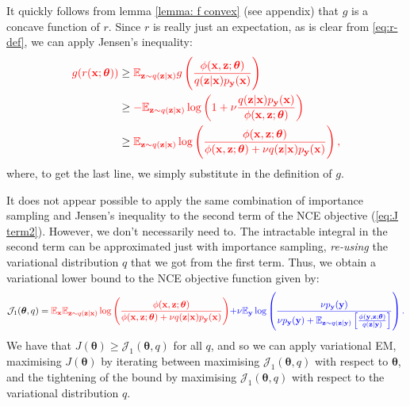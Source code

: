 \documentclass[11pt, oneside]{article}
\newcommand{\thetab}{{\boldsymbol{\theta}}}
\newcommand{\pnn}{\phi}
\newcommand{\pnoise}{p_{ \mathbf y}}
\newcommand{\q}[1]{q(\z|{#1})}
\newcommand{\x}{{\mathbf x}}
\newcommand{\y}{{\mathbf y}}
\newcommand{\z}{{\mathbf z}}
\newcommand{\E}{\mathbb{E}}
\newcommand{\Ex}{\E_{\x}}
\newcommand{\Ey}{\E_{\y}}
\newcommand{\Evar}[1]{\E_{\z \sim \q{#1}}}
\newcommand{\J}{\mathcal{J}}
\theoremstyle{definition}
\begin{document}
It quickly follows from lemma \ref{lemma: f convex} (see appendix) that $g$ is a concave function of $r$. Since $r$ is really just an expectation, as is clear from \ref{eq:r-def}, we can apply Jensen's inequality:
\begin{align}
 \color{red}{g(r(\x; \thetab))}  
    &\geq  \color{red}{\Evar{\x} g \left( \frac{\pnn(\x, \z;\thetab)}{\q{\x}\pnoise(\x)} \right)} \\
    &\geq  \color{red}{-\Evar{\x} \log \left(1+\nu \frac{\q{\x}\pnoise(\x)}{\pnn(\x,\z; \thetab)}\right)}  \\
    &\geq  \color{red}{\Evar{\x} \log \left( \frac{\pnn(\x,\z; \thetab)}{\pnn(\x,\z; \thetab) + \nu\q{\x}\pnoise(\x)} \right),} 
\end{align}
where, to get the last line, we simply substitute in the definition of $g$.

It does not appear possible to apply the same combination of importance sampling and Jensen's inequality to the second term of the NCE objective (\ref{eq:J term2}). However, we don’t necessarily need to. The intractable integral in the second term can be approximated just with importance sampling, \emph{re-using} the variational distribution $q$ that we got from the first term. Thus, we obtain a variational lower bound to the NCE objective function given by:
\begin{equation}
  \J_1(\thetab, q) 
  = \color{red}{\Ex \Evar{\x} \log \left( \frac{\pnn(\x,\z; \thetab)}{\pnn(\x,\z; \thetab) + \nu\q{\x}\pnoise(\x)} \right)}
   \color{blue}{ + \nu \Ey \log \left( \frac{\nu\pnoise(\y)}{\nu\pnoise(\y) + \E_{\z \sim q(\z | \y)} \left[\frac{\pnn(\y,\z; \thetab)}{q(\z | \y)} \right]}  \right).}
  \label{eq:obj1}
\end{equation}
We have that $J(\thetab) \ge \J_1(\thetab, q)$ for all $q$, and so we can apply variational EM, maximising $J(\thetab)$ by iterating between maximising $\J_1(\thetab,q)$ with respect to $\thetab$, and the tightening of the bound by maximising $\J_1(\thetab,q)$ with respect to the variational distribution $q$.
\end{document}

